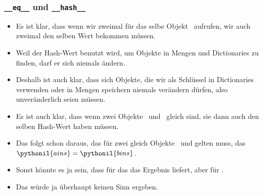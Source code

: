 \documentclass[aspectratio=169,mathserif,notheorems]{beamer}%
\begin{document}
%
\begin{frame}%
\frametitle{\texttt{\_\_eq\_\_} und \texttt{\_\_hash\_\_}}%
\begin{itemize}%
\item Es ist klar, dass wenn wir  zweimal für das selbe Objekt~ aufrufen, wir auch zweimal den selben Wert bekommen müssen.%
%
\item<2-> Weil der Hash-Wert benutzt wird, um Objekte in Mengen und Dictionaries zu finden, darf er sich niemals ändern.%
%
\item<3-> Deshalb ist auch klar, dass sich Objekte, die wir als Schlüssel in Dictionaries verwenden oder in Mengen speichern niemals verändern dürfen, also unveränderlich seien müssen.%
%
\item<4-> Es ist auch klar, dass wenn zwei Objekte~ und~ gleich sind, sie dann auch den selben Hash-Wert haben müssen.%
%
\item<5-> Das folgt schon daraus, das für zwei gleich Objekte~ und  gelten muss, das $\pythonil{a in s}=\pythonil{b in s}$.%
%
\item<6-> Sonst könnte es ja sein, dass  für das   das Ergebnis  liefert, aber  für .%
%
\item<7-> Das würde ja überhaupt keinen Sinn ergeben.%
\end{itemize}%
\end{frame}%
%
\end{document}
